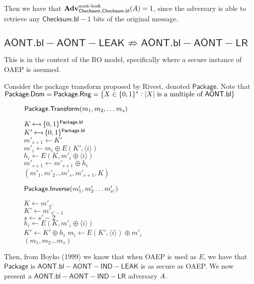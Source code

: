 \documentclass[11pt,twoside]{article}
\begin{document}
Then we have that $\textbf{Adv}^\text{aont-leak}_{\mathsf{Checksum},\mathsf{Checksum.bl}}(A)=1$, since the adversary is able to retrieve any $\mathsf{Checksum.bl}-1$ bits of the original message. 

\subsection{$\mathsf{AONT.bl-AONT-LEAK}\not\Rightarrow \mathsf{AONT.bl-AONT-LR}$}

This is in the context of the RO model, specifically where a secure instance of OAEP is assumed.

Consider the package transform proposed by Rivest, denoted $\mathsf{Package}$. Note that $\mathsf{Package.Dom} = \mathsf{Package.Rng}=\{X\in\{0,1\}^* : |X| \text{ is a multiple of } \mathsf{AONT.bl}\}$

\begin{figure}[H]
{
\underline{$\mathsf{Package.Transform}(m_1,m_2,\dots m_s)$}

\begin{algorithm}[H]
$K\getsr \bits^\schemefont{Package.bl}$\\
$K'\getsr \bits^\schemefont{Package.bl}$\\
$m'_{s+1}\gets K'$\\
{
$m'_i\gets m_i \oplus E(K',\langle i \rangle)$\\
$h_i\gets E(K,m'_i\oplus \langle i \rangle)$\\
$m'_{s+1}\gets m'_{s+1}\oplus h_i$\\
}
\Return $(m'_1,m'_2\dots m'_s, m'_{s+1}, K)$
\end{algorithm}
}
{
\underline{$\mathsf{Package.Inverse}(m'_1,m'_2\dots m'_{s'})$}

\begin{algorithm}[H]
$K\gets m'_{s'}$\\
$K'\gets m'_{s'-1}$\\
$s\gets s'-2$\\
{
$h_i\gets E(K,m'_i\oplus \langle i\rangle )$\\
$K'\gets K'\oplus h_i$
}
{
$m_i\gets E(K',\langle i\rangle)\oplus m'_i$\\
}
\Return $(m_1,m_2\dots m_{s})$
\end{algorithm}
}
\end{figure} 

Then, from Boyko (1999) we know that when OAEP is used as $E$, we have that $\mathsf{Package}$ is $\mathsf{AONT.bl-AONT-IND-LEAK}$ is as secure as OAEP. We now present a $\mathsf{AONT.bl-AONT-IND-LR}$ adversary $A$. 
\end{document}

